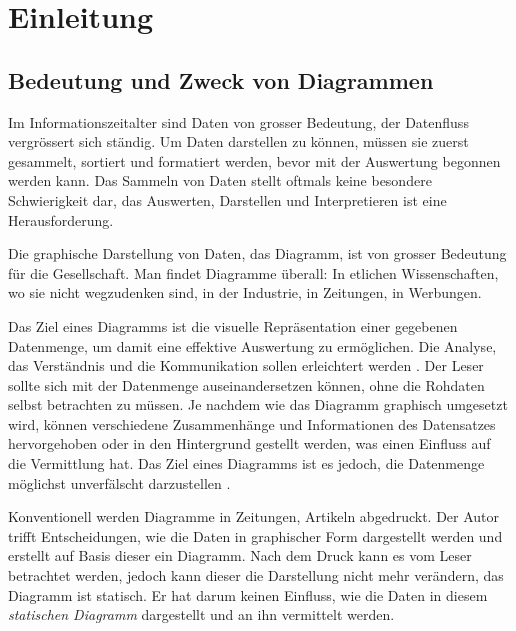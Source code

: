 \chapter{Einleitung}

\section{Bedeutung  und Zweck von Diagrammen}

Im Informationszeitalter sind Daten von grosser Bedeutung, der Datenfluss vergrössert sich ständig. Um Daten darstellen zu können, müssen sie zuerst gesammelt, sortiert und formatiert werden, bevor mit der Auswertung begonnen werden kann. Das Sammeln von Daten stellt oftmals keine besondere Schwierigkeit dar, das Auswerten, Darstellen und Interpretieren ist eine Herausforderung.

Die graphische Darstellung von Daten, das Diagramm, ist von grosser Bedeutung für die Gesellschaft. Man findet Diagramme überall: In etlichen Wissenschaften, wo sie nicht wegzudenken sind, in der Industrie, in Zeitungen, in Werbungen.


Das Ziel eines Diagramms ist die visuelle Repräsentation einer gegebenen Datenmenge, um damit eine effektive Auswertung zu ermöglichen. Die Analyse, das Verständnis und die Kommunikation sollen erleichtert werden \cite{viz}. Der Leser sollte sich mit der Datenmenge auseinandersetzen können, ohne die Rohdaten selbst betrachten zu müssen. Je nachdem wie das Diagramm graphisch umgesetzt wird, können verschiedene Zusammenhänge und Informationen des Datensatzes hervorgehoben oder in den Hintergrund gestellt werden, was einen Einfluss auf die Vermittlung hat. 
Das Ziel eines Diagramms ist es jedoch, die Datenmenge möglichst unverfälscht darzustellen \cite{viz}. 


Konventionell werden Diagramme in Zeitungen, Artikeln abgedruckt. Der Autor trifft Entscheidungen, wie die Daten in graphischer Form dargestellt werden und erstellt auf Basis dieser ein Diagramm. Nach dem Druck kann es vom Leser betrachtet werden, jedoch kann dieser die Darstellung nicht mehr verändern, das Diagramm ist statisch. Er hat darum keinen Einfluss, wie die Daten in diesem \textit{statischen Diagramm} dargestellt und an ihn vermittelt werden.


